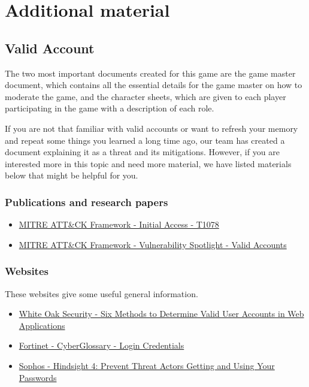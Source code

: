 \chapter{Additional material}
\section{Valid Account}
The two most important documents created for this game are the game master document, which contains all the essential details for the game master on how to moderate the game, and the character sheets, which are given to each player participating in the game with a description of each role.

If you are not that familiar with valid accounts or want to refresh your memory and repeat some things you learned a long time ago, our team has created a document explaining it as a threat and its mitigations. 
However, if you are interested more in this topic and need more material, we have listed materials below that might be helpful for you.

\subsection{Publications and research papers}

\begin{itemize}
    \item \href{https://attack.mitre.org/techniques/T1078/}{MITRE ATT\&CK Framework - Initial Access - T1078}
    \item \href{https://resources.infosecinstitute.com/topic/mitre-attck-vulnerability-spotlight-valid-accounts/}{MITRE ATT\&CK Framework - Vulnerability Spotlight - Valid Accounts}
\end{itemize}

\subsection{Websites}

These websites give some useful general information.

\begin{itemize}
    \item \href{https://www.whiteoaksecurity.com/blog/2019-2-11-six-methods-to-determine-valid-user-accounts-in-web-applications/}{White Oak Security - Six Methods to Determine Valid User Accounts in Web Applications}
    \item \href{https://www.fortinet.com/resources/cyberglossary/login-credentials}{Fortinet - CyberGlossary - Login Credentials}
    \item \href{https://news.sophos.com/en-us/2021/08/24/hindsight-4-prevent-threat-actors-getting-and-using-your-passwords/}{Sophos - Hindsight 4: Prevent Threat Actors Getting and Using Your Passwords}
\end{itemize}

